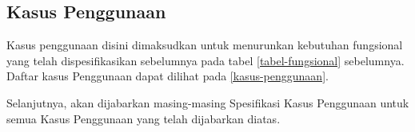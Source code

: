 \subsection{Kasus Penggunaan}
	Kasus penggunaan disini dimaksudkan untuk menurunkan kebutuhan fungsional yang telah dispesifikasikan sebelumnya pada tabel \ref{tabel-fungsional} sebelumnya.\\
	Daftar kasus Penggunaan dapat dilihat pada \cref{kasus-penggunaan}.
	
	\begin{table}[H]
		\centering
		\caption{Tabel Kasus Penggunaan}
		\label{kasus-penggunaan}
	\end{table}
	
	Selanjutnya, akan dijabarkan masing-masing Spesifikasi Kasus Penggunaan untuk semua  Kasus Penggunaan yang telah dijabarkan diatas.
	
	
	
	
	
	
	
	
	
	
	
	
	
	
	
	



